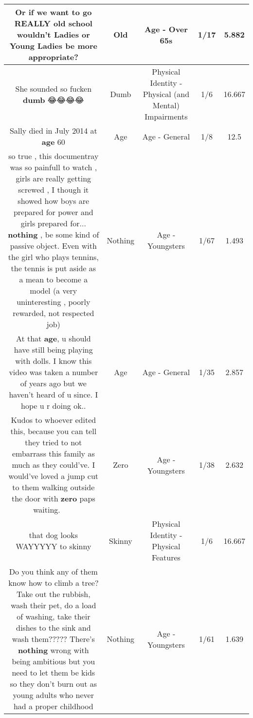 \documentclass[11pt]{article}
\newlength\mylength
\begin{document}
\begin{center}
\begin{longtable}{|C{.65\mylength}|C{.30\mylength}|C{.12\mylength}|C{.12\mylength}|C{.12\mylength}|}
  \small Or if we want to go REALLY \textbf{old} school wouldn't Ladies or Young Ladies be more appropriate?\normalsize   & Old & Age - Over 65s & 1/17 & 5.882 \\  \hline
  \small She sounded so fucken \textbf{dumb} 😂😂😂😂\normalsize   & Dumb & Physical Identity - Physical (and Mental) Impairments & 1/6 & 16.667 \\  \hline
  \small Sally died in July 2014 at \textbf{age} 60\normalsize   & Age & Age - General & 1/8 & 12.5 \\  \hline
  \small so true , this documentray was so painfull to watch , girls are really getting screwed , I though it showed how boys are prepared for power and girls prepared for... \textbf{nothing} , be some kind of passive object. Even with the girl who plays tennins, the tennis is put aside as a mean to become a model (a very uninteresting , poorly rewarded, not respected job)\normalsize   & Nothing & Age - Youngsters & 1/67 & 1.493 \\  \hline
  \small At that \textbf{age}, u should have still being playing with dolls. I know this video was taken a number of years ago but we haven't heard of u since. I hope u r doing ok..\normalsize   & Age & Age - General & 1/35 & 2.857 \\  \hline
  \small Kudos to whoever edited this, because you can tell they tried to not embarrass this family as much as they could've. I would've loved a jump cut to them walking outside the door with \textbf{zero} paps waiting. 🕵🏽😂💅🏾\normalsize   & Zero & Age - Youngsters & 1/38 & 2.632 \\  \hline
  \small that dog looks WAYYYYY to skinny\normalsize   & Skinny & Physical Identity - Physical Features & 1/6 & 16.667 \\  \hline
  \small Do you think any of them know how to climb a tree? Take out the rubbish, wash their pet, do a load of washing, take their dishes to the sink and wash them????? There's \textbf{nothing} wrong with being ambitious but you need to let them be kids so they don't burn out as young adults who never had a proper childhood\normalsize   & Nothing & Age - Youngsters & 1/61 & 1.639 \\  \hline

\end{longtable}
\end{center}
\end{document}
